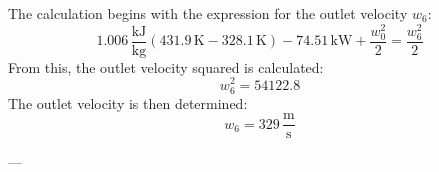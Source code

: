 The calculation begins with the expression for the outlet velocity \( w_6 \):  
\[
1.006 \, \frac{\text{kJ}}{\text{kg}} \left( 431.9 \, \text{K} - 328.1 \, \text{K} \right) - 74.51 \, \text{kW} + \frac{w_0^2}{2} = \frac{w_6^2}{2}
\]  
From this, the outlet velocity squared is calculated:  
\[
w_6^2 = 54122.8
\]  
The outlet velocity is then determined:  
\[
w_6 = 329 \, \frac{\text{m}}{\text{s}}
\]  

---